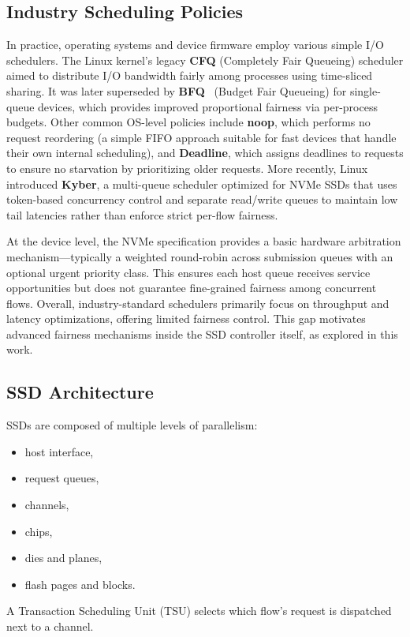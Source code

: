 \documentclass[11pt]{article}
\begin{document}
\subsection{Industry Scheduling Policies}

In practice, operating systems and device firmware employ various simple I/O schedulers. The Linux kernel's legacy \textbf{CFQ} (Completely Fair Queueing) scheduler aimed to distribute I/O bandwidth fairly among processes using time-sliced sharing. It was later superseded by \textbf{BFQ}~\cite{bfq} (Budget Fair Queueing) for single-queue devices, which provides improved proportional fairness via per-process budgets. Other common OS-level policies include \textbf{noop}, which performs no request reordering (a simple FIFO approach suitable for fast devices that handle their own internal scheduling), and \textbf{Deadline}, which assigns deadlines to requests to ensure no starvation by prioritizing older requests. More recently, Linux introduced \textbf{Kyber}, a multi-queue scheduler optimized for NVMe SSDs that uses token-based concurrency control and separate read/write queues to maintain low tail latencies rather than enforce strict per-flow fairness.

At the device level, the NVMe specification provides a basic hardware arbitration mechanism—typically a weighted round-robin across submission queues with an optional urgent priority class. This ensures each host queue receives service opportunities but does not guarantee fine-grained fairness among concurrent flows. Overall, industry-standard schedulers primarily focus on throughput and latency optimizations, offering limited fairness control. This gap motivates advanced fairness mechanisms inside the SSD controller itself, as explored in this work.

\subsection{SSD Architecture}
SSDs are composed of multiple levels of parallelism:
\begin{itemize}
    \item host interface,
    \item request queues,
    \item channels,
    \item chips,
    \item dies and planes,
    \item flash pages and blocks.
\end{itemize}
A Transaction Scheduling Unit (TSU) selects which flow’s request is dispatched next to a channel.
\end{document}
